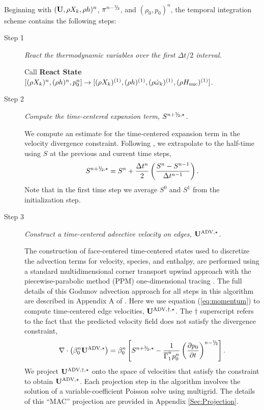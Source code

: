 Beginning with $({\bf{U}},\rho X_k,\rho h)^n$, $\pi^{n-\myhalf}$, and $(\rho_0,p_0)^n$,
the temporal integration scheme contains the following steps:
\begin{description}

\item[Step 1] {\em React the thermodynamic variables over the first $\Delta t / 2$ interval.}

Call {\bf React State}$[(\rho X_k)^n, (\rho h)^n, p_0^n] \rightarrow [(\rho X_k)^{(1)}, (\rho h)^{(1)}, (\rho \dot\omega_k)^{(1)}, (\rho H_{\rm nuc})^{(1)}]$.


\item[Step 2] {\em Compute the time-centered expansion term, $S^{\nph,\star}$.}

We compute an estimate for the time-centered expansion term in the velocity
divergence constraint.  Following \citet{Bell:2004}, we extrapolate
to the half-time using $S$ at the previous and current
time steps,
\begin{equation}
S^{\nph,\star} = S^n + \frac{\dt^n}{2} \left(\frac{S^n - S^{n-1}}{\dt^{n-1}}\right).
\end{equation}
Note that in the first time step we average $S^0$ and $S^1$ from the
initialization step.

\item[Step 3] {\em Construct a time-centered advective velocity on edges, ${\bf{U}}^{\mathrm{ADV},\star}$.}

The construction of face-centered time-centered states used to discretize the
advection terms for velocity, species, and enthalpy, are performed using
a standard multidimensional corner transport upwind approach
\citep{colella1990multidimensional,saltzman1994unsplit} with the piecewise-parabolic method (PPM)
one-dimensional tracing \citep{colella1984piecewise}.  The full details of this
Godunov advection approach for all steps in this algorithm are described 
in Appendix A of \cite{XRB_III}.
Here we use equation (\ref{eq:momentum}) to compute time-centered edge velocities, ${\bf{U}}^{\mathrm{ADV},\dagger,\star}$.
The $\dagger$ superscript refers to the fact that the predicted velocity field does not satisfy the divergence constraint,
\begin{equation}
\nabla \cdot \left(\beta_0^n \uadvone\right) = \beta_0^n \left[S^{\nph,\star} - \frac{1}{\gammaonebar^np_0^n}\left(\frac{\partial p_0}{\partial t}\right)^{n-\myhalf} \right].\label{eq:div1}
\end{equation}
 We project ${\bf{U}}^{\mathrm{ADV},\dagger,\star}$ onto the space of velocities that satisfy the constraint to obtain ${\bf{U}}^{\mathrm{ADV},\star}$.
Each projection step in the algorithm involves the solution of a variable-coefficient Poisson solve using multigrid.
The details of this ``MAC'' projection are provided in Appendix \ref{Sec:Projection}.


\end{description}
